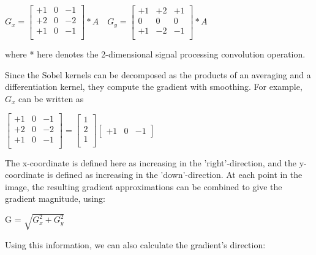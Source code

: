 \begin{center}

$  G_{x} = 
  \begin{bmatrix}
	+1 & 0 & -1 \\
	+2 & 0 & -2 \\
	+1 & 0 & -1 \\
   \end{bmatrix} * A  \quad
  G_{y} = 
  \begin{bmatrix}
	+1 & +2 & +1 \\
	0 & 0 & 0 \\
	+1 & -2 & -1 \\
  \end{bmatrix} * A		$

\end{center}

where * here denotes the 2-dimensional signal processing convolution operation.

Since the Sobel kernels can be decomposed as the products of an averaging and a differentiation kernel, they compute the gradient with smoothing. For example, \textbf{$G_{x}$}  can be written as

\begin{center}
$  \begin{bmatrix}
	+1 & 0 & -1 \\
	+2 & 0 & -2 \\
	+1 & 0 & -1 \\
   \end{bmatrix} =  \begin{bmatrix}
	1 \\
	2 \\
	1 \\
  \end{bmatrix} \begin{bmatrix}
	+1 & 0 & -1
  \end{bmatrix}
$
\end{center}


The x-coordinate is defined here as increasing in the 'right'-direction, and the y-coordinate is defined as increasing in the 'down'-direction. At each point in the image, the resulting gradient approximations can be combined to give the gradient magnitude, using:

\begin{center}
G = $\sqrt{ G_{x}^{2} + G_{y}^{2} }$
\end{center}

Using this information, we can also calculate the gradient's direction:

